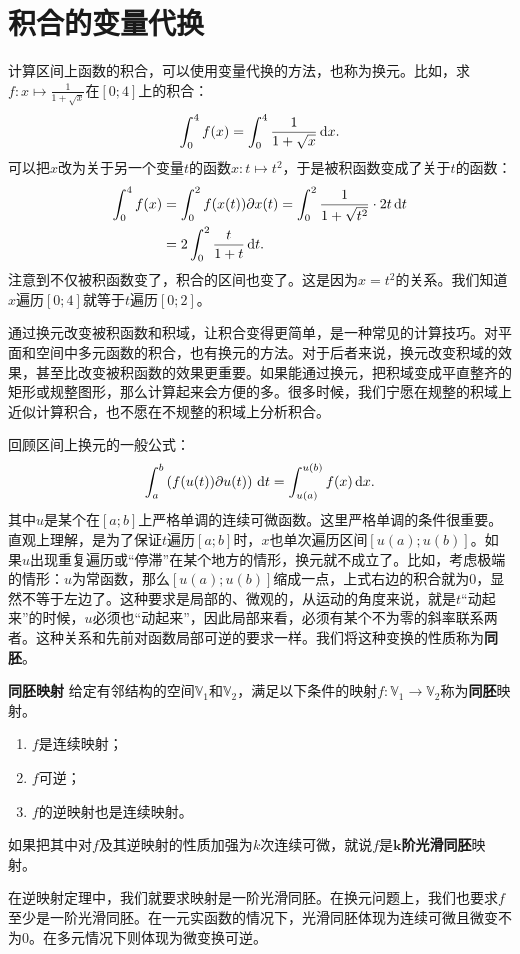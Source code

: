 \documentclass[12pt,UTF8,fontset=none]{ctexbook}
\begin{document}
\section{积合的变量代换}
计算区间上函数的积合，可以使用变量代换的方法，也称为换元。比如，求$f:x\mapsto \frac{1}{1+\sqrt{x}}$在$[0;4]$上的积合：
$$ \int_0^4 f(x) = \int_0^4 \frac{1}{1+\sqrt{x}}\,\mathrm{d}x.$$
可以把$x$改为关于另一个变量$t$的函数$x : t\mapsto t^2$，于是被积函数变成了关于$t$的函数：
\begin{align*}
    \int_0^4 f(x) &= \int_0^2 f(x(t))\partial x(t) = \int_0^2 \frac{1}{1+\sqrt{t^2}}\cdot 2t\,\mathrm{d}t \\
    &= 2\int_0^2 \frac{t}{1+t}\,\mathrm{d}t.
\end{align*}
注意到不仅被积函数变了，积合的区间也变了。这是因为$x = t^2$的关系。我们知道$x$遍历$[0;4]$就等于$t$遍历$[0;2]$。

通过换元改变被积函数和积域，让积合变得更简单，是一种常见的计算技巧。对平面和空间中多元函数的积合，也有换元的方法。对于后者来说，换元改变积域的效果，甚至比改变被积函数的效果更重要。如果能通过换元，把积域变成平直整齐的矩形或规整图形，那么计算起来会方便的多。很多时候，我们宁愿在规整的积域上近似计算积合，也不愿在不规整的积域上分析积合。

回顾区间上换元的一般公式：
$$ \int_a^b \left( f(u(t)) \partial u (t) \right)\,\mathrm{d}t = \int_{u(a)}^{u(b)} f(x)\,\mathrm{d}x.$$
其中$u$是某个在$[a;b]$上严格单调的连续可微函数。这里严格单调的条件很重要。直观上理解，是为了保证$t$遍历$[a;b]$时，$x$也单次遍历区间$[u(a);u(b)]$。如果$u$出现重复遍历或“停滞”在某个地方的情形，换元就不成立了。比如，考虑极端的情形：$u$为常函数，那么$[u(a);u(b)]$缩成一点，上式右边的积合就为$0$，显然不等于左边了。这种要求是局部的、微观的，从运动的角度来说，就是$t$“动起来”的时候，$u$必须也“动起来”，因此局部来看，必须有某个不为零的斜率联系两者。这种关系和先前对函数局部可逆的要求一样。我们将这种变换的性质称为\textbf{同胚}。
\begin{df}{\textbf{同胚映射}}
    给定有邻结构的空间$\mathbb{V}_1$和$\mathbb{V}_2$，满足以下条件的映射$f:\mathbb{V}_1\rightarrow\mathbb{V}_2$称为\textbf{同胚}映射。
    \begin{enumerate}[label=\arabic*.]
        \item $f$是连续映射；
        \item $f$可逆；
        \item $f$的逆映射也是连续映射。
    \end{enumerate}
    如果把其中对$f$及其逆映射的性质加强为$k$次连续可微，就说$f$是$\boldsymbol{k}$\textbf{阶光滑同胚}映射。
\end{df}
在逆映射定理中，我们就要求映射是一阶光滑同胚。在换元问题上，我们也要求$f$至少是一阶光滑同胚。在一元实函数的情况下，光滑同胚体现为连续可微且微变不为$0$。在多元情况下则体现为微变换可逆。
\end{document}
